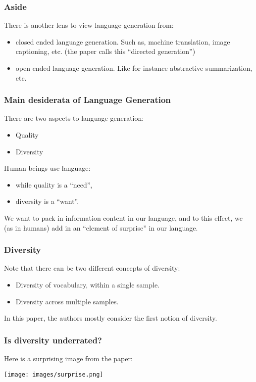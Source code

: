 \documentclass[11pt]{beamer}
\begin{document}
\begin{frame}
  \frametitle{Aside}
There is another lens to view language generation from:
\begin{itemize}
  \item closed ended language generation. Such as, machine translation, image captioning, etc.
  (the paper calls this ``directed generation'')
\pause
  \item open ended language generation. Like for instance abstractive summarization, etc.
\end{itemize}
\end{frame}

\begin{frame}
  \frametitle{Main desiderata of Language Generation}
There are two aspects to language generation:
\begin{itemize}
  \item Quality
  \item Diversity
\end{itemize}
Human beings use language:
\begin{itemize}
  \item while quality is a ``need'',
  \item diversity is a ``want''.
\end{itemize}

We want to pack in information content in our language, and to this effect, we
(as in humans) add in an ``element of surprise'' in our language.
\end{frame}

\begin{frame}
  \frametitle{Diversity}
  Note that there can be two different concepts of diversity:
  \begin{itemize}
    \item Diversity of vocabulary, within a single sample.
    \item Diversity across multiple samples.
  \end{itemize}
  In this paper, the authors mostly consider the first notion of diversity.
\end{frame}

\begin{frame}
  \frametitle{Is diversity underrated?}
  Here is a surprising image from the paper:
  \begin{center}
  \texttt{[image: images/surprise.png]}
  \end{center}
\end{frame}
\end{document}

